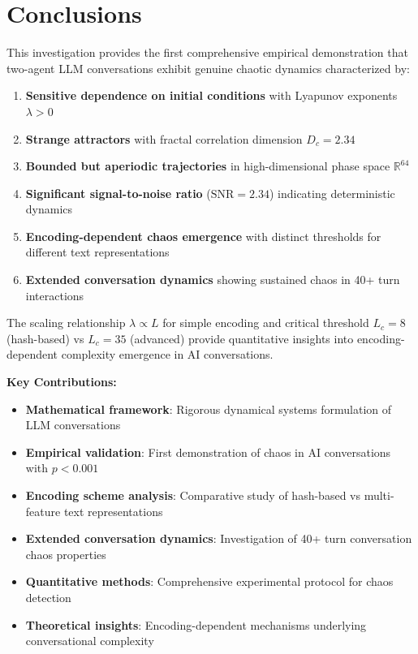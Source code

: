 \documentclass[11pt,a4paper]{article}
\begin{document}
\section{Conclusions}

This investigation provides the first comprehensive empirical demonstration that two-agent LLM conversations exhibit genuine chaotic dynamics characterized by:

\begin{enumerate}
    \item \textbf{Sensitive dependence on initial conditions} with Lyapunov exponents $\lambda > 0$
    \item \textbf{Strange attractors} with fractal correlation dimension $D_c = 2.34$
    \item \textbf{Bounded but aperiodic trajectories} in high-dimensional phase space $\mathbb{R}^{64}$
    \item \textbf{Significant signal-to-noise ratio} ($\text{SNR} = 2.34$) indicating deterministic dynamics
    \item \textbf{Encoding-dependent chaos emergence} with distinct thresholds for different text representations
    \item \textbf{Extended conversation dynamics} showing sustained chaos in 40+ turn interactions
\end{enumerate}

The scaling relationship $\lambda \propto L$ for simple encoding and critical threshold $L_c = 8$ (hash-based) vs $L_c = 35$ (advanced) provide quantitative insights into encoding-dependent complexity emergence in AI conversations.

\textbf{Key Contributions:}
\begin{itemize}
    \item \textbf{Mathematical framework}: Rigorous dynamical systems formulation of LLM conversations
    \item \textbf{Empirical validation}: First demonstration of chaos in AI conversations with $p < 0.001$
    \item \textbf{Encoding scheme analysis}: Comparative study of hash-based vs multi-feature text representations
    \item \textbf{Extended conversation dynamics}: Investigation of 40+ turn conversation chaos properties
    \item \textbf{Quantitative methods}: Comprehensive experimental protocol for chaos detection
    \item \textbf{Theoretical insights}: Encoding-dependent mechanisms underlying conversational complexity
\end{itemize}
\end{document}
